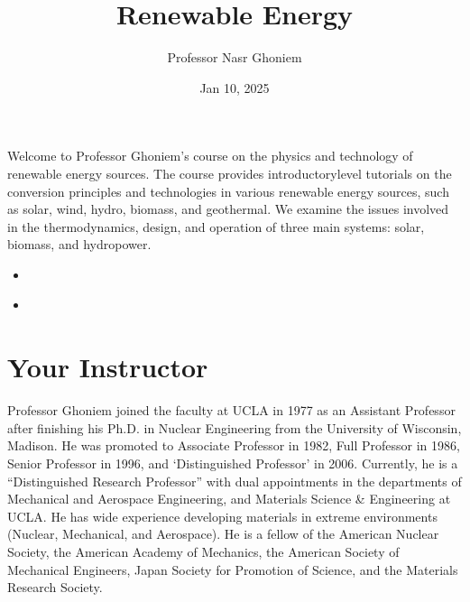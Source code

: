 \documentclass[letterpaper,10pt,english]{jupyterBook}
\title{Renewable Energy}
\date{Jan 10, 2025}
\author{Professor Nasr Ghoniem}
\begin{document}
\pagestyle{empty}
\sphinxmaketitle
\pagestyle{plain}
\sphinxtableofcontents
\pagestyle{normal}
\label{\detokenize{intro::doc}}


\sphinxAtStartPar
Welcome to Professor Ghoniem’s course on the physics and technology of renewable energy sources. The course provides introductory\sphinxhyphen{}level tutorials on the
conversion principles and technologies in various renewable energy sources,
such as solar, wind, hydro, biomass, and geothermal. We examine the
issues involved in the thermodynamics, design, and operation of three
main systems: solar, biomass, and hydro\sphinxhyphen{}power.
\begin{itemize}
\item {} 
\sphinxAtStartPar
{\hyperref[\detokenize{10WeekSyllabus::doc}]{}}

\item {} 
\sphinxAtStartPar
{\hyperref[\detokenize{ProjectSyllabus::doc}]{}}

\end{itemize}

\sphinxstepscope


\chapter{Your Instructor}
\label{\detokenize{10WeekSyllabus:your-instructor}}\label{\detokenize{10WeekSyllabus::doc}}
\sphinxAtStartPar
Professor Ghoniem joined the faculty at UCLA in 1977 as an Assistant
Professor after finishing his Ph.D. in Nuclear Engineering from the
University of Wisconsin, Madison. He was promoted to Associate Professor
in 1982, Full Professor in 1986, Senior Professor in 1996, and
‘Distinguished Professor’ in 2006. Currently, he is a “Distinguished
Research Professor” with dual appointments in the departments of
Mechanical and Aerospace Engineering, and Materials Science \&
Engineering at UCLA. He has wide experience developing
materials in extreme environments (Nuclear, Mechanical, and Aerospace).
He is a fellow of the American Nuclear Society, the American Academy of
Mechanics, the American Society of Mechanical Engineers, Japan
Society for Promotion of Science, and the Materials Research Society.

\begin{sphinxVerbatim}[commandchars=\\\{\}]

\end{sphinxVerbatim}
\end{document}
